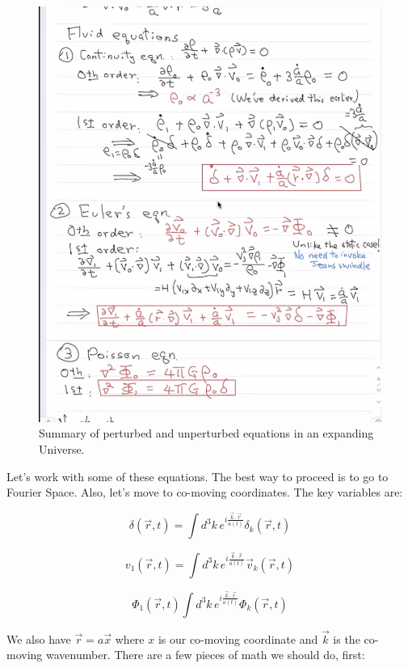 \documentclass{article}
\newcommand{\be}{\begin{equation}}
\newcommand{\ee}{\end{equation}}
\begin{document}
\begin{figure}
    \centering
    \includegraphics{Screen Shot 2021-03-29 at 10.22.16 AM.png}
    \caption{Summary of perturbed and unperturbed equations in an expanding Universe.}
    \label{fig:summ}
\end{figure}

Let's work with some of these equations. The best way to proceed is to go to Fourier Space. Also, let's move to co-moving coordinates.  The key variables are:

\be
\delta(\vec{r},t) = \int d^3 k \, e^{i\frac{\vec{k} \cdot \vec{r}}{a(t)}}\delta_k(\vec{r},t)
\ee

\be
v_1 \left(\vec{r},t\right)= \int d^3 k \, e^{i\frac{\vec{k} \cdot \vec{r}}{a(t)}} \vec{v}_k(\vec{r},t)
\ee

\be
\Phi_1\left(\vec{r},t\right) \int d^3 k \, e^{i\frac{\vec{k} \cdot \vec{r}}{a(t)}} \Phi_k(\vec{r},t)
\ee

We also have $\vec{r} = a \vec{x}$ where $x$ is our co-moving coordinate and $\vec{k}$ is the co-moving wavenumber. There are a few pieces of math we should do, first:
\end{document}
